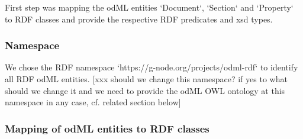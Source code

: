 \documentclass{article}
\begin{document}
First step was mapping the odML entities `Document`, `Section` and `Property` to RDF
classes and provide the respective RDF predicates and xsd types.

\subsubsection{Namespace}

We chose the RDF namespace `https://g-node.org/projects/odml-rdf` to identify all RDF
odML entities. [xxx should we change this namespace? if yes to what should we change it
and we need to provide the odML OWL ontology at this namespace in any case, cf. related section below]

\subsubsection{Mapping of odML entities to RDF classes}
\end{document}
